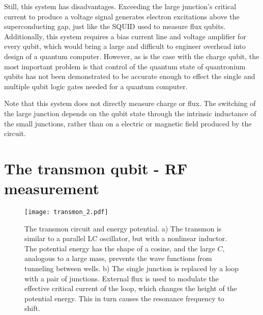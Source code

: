 Still, this system has disadvantages.
Exceeding the large junction's critical current to produce a voltage signal generates electron excitations above the superconducting gap, just like the SQUID used to measure flux qubits.
Additionally, this system requires a bias current line and voltage amplifier for every qubit, which would bring a large and difficult to engineer overhead into design of a quantum computer.
However, as is the case with the charge qubit, the most important problem is that control of the quantum state of quantronium qubits has not been demonstrated to be accurate enough to effect the single and multiple qubit logic gates needed for a quantum computer.

Note that this system does not directly measure charge or flux. The switching of the large junction depends on the qubit state through the intrinsic inductance of the small junctions, rather than on a electric or magnetic field produced by the circuit.

\section{The transmon qubit - RF measurement}

\begin{figure}
\begin{centering}
\texttt{[image: transmon\_2.pdf]} 
\par\end{centering}
\caption{The transmon circuit and energy potential. a) The transmon is similar to a parallel LC oscillator, but with a nonlinear inductor. The potential energy has the shape of a cosine, and the large $C$, analogous to a large mass, prevents the wave functions from tunneling between wells. b) The single junction is replaced by a loop with a pair of junctions. External flux is used to modulate the effective critical current of the loop, which changes the height of the potential energy. This in turn causes the resonance frequency to shift.}
\label{Fig:transmon}
\end{figure}

